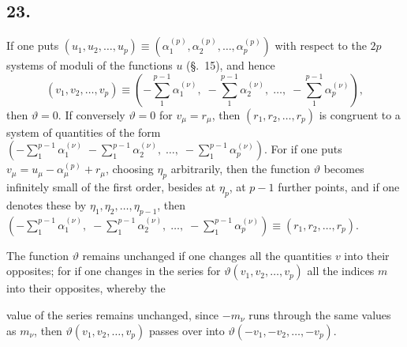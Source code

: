 \documentclass{article}
\begin{document}
\subsection*{23.}

If one puts $(u_{1}, u_{2}, \ldots, u_{p}) \equiv (\alpha_{1}^{(p)}, \alpha_{2}^{(p)}, \ldots, \alpha_{p}^{(p)})$ with respect to the $2p$ systems of moduli of the functions $u$ (§.~15), and hence
\[ (v_{1}, v_{2}, \ldots, v_{p}) \equiv \left(-\sum_{1}^{p-1} \alpha_{1}^{(\nu)}, \; -\sum_{1}^{p-1} \alpha_{2}^{(\nu)}, \; \ldots, \; -\sum_{1}^{p-1} \alpha_{p}^{(\nu)}\right), \]
then $\vartheta = 0$. If conversely $\vartheta = 0$ for $v_{\mu} = r_{\mu}$, then $(r_{1}, r_{2}, \ldots, r_{p})$ is congruent to a system of quantities of the form $\left(-\displaystyle\sum_{1}^{p-1} \alpha_{1}^{(\nu)} \; -\sum_{1}^{p-1} \alpha_{2}^{(\nu)}, \; \ldots, \; -\sum_{1}^{p-1} \alpha_{p}^{(\nu)}\right)$. For if one puts $v_{\mu} = u_{\mu} - \alpha_{\mu}^{(p)} + r_{\mu}$, choosing $\eta_{p}$ arbitrarily, then the function $\vartheta$ becomes infinitely small of the first order, besides at $\eta_{p}$, at $p-1$ further points, and if one denotes these by $\eta_{1}, \eta_{2}, \ldots, \eta_{p-1}$, then $\left(-\displaystyle\sum_{1}^{p-1} \alpha_{1}^{(\nu)}, \; -\sum_{1}^{p-1} \alpha_{2}^{(\nu)}, \; \ldots, \; -\sum_{1}^{p-1} \alpha_{p}^{(\nu)}\right) \equiv (r_{1}, r_{2}, \ldots, r_{p})$.

The function $\vartheta$ remains unchanged if one changes all the quantities $v$ into their opposites; for if one changes in the series for $\vartheta(v_{1}, v_{2}, \ldots, v_{p})$ all the indices $m$ into their opposites, whereby the

value of the series remains unchanged, since $-m_{\nu}$ runs through the same values as $m_{\nu}$, then $\vartheta(v_{1}, v_{2}, \ldots, v_{p})$ passes over into $\vartheta(-v_{1}, -v_{2}, \ldots, -v_{p})$.
\end{document}
